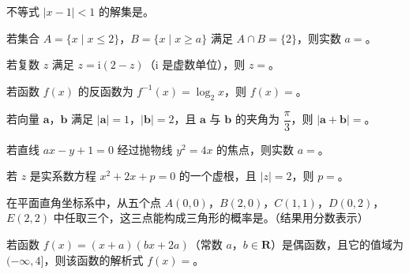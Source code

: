 


\begin{question}
不等式 $|x-1|<1$ 的解集是\gkblank{}。

\end{question}
\begin{question}
若集合 $A=\{x\mid x\leqslant2\}$，$B=\{x\mid x\geqslant a\}$ 满足 $A\cap B=\{2\}$，则实数 $a=$\gkblank{}。

\end{question}
\begin{question}
若复数 $z$ 满足 $z=\mathrm i(2-z)$（$\mathrm i$ 是虚数单位），则 $z=$\gkblank{}。

\end{question}
\begin{question}
若函数 $f(x)$ 的反函数为 $f^{-1}(x)=\log_2x$，则 $f(x)=$\gkblank{}。

\end{question}
\begin{question}
若向量 $\boldsymbol a$，$\boldsymbol b$ 满足 $|\boldsymbol a|=1$，$|\boldsymbol b|=2$，且 $\boldsymbol a$ 与 $\boldsymbol b$ 的夹角为 $\dfrac{\pi}3$，则 $|\boldsymbol a+\boldsymbol b|=$\gkblank{}。

\end{question}
\begin{question}
若直线 $ax-y+1=0$ 经过抛物线 $y^2=4x$ 的焦点，则实数 $a=$\gkblank{}。

\end{question}
\begin{question}
若 $z$ 是实系数方程 $x^2+2x+p=0$ 的一个虚根，且 $|z|=2$，则 $p=$\gkblank{}。

\end{question}
\begin{question}
在平面直角坐标系中，从五个点 $A(0,0)$，$B(2,0)$，$C(1,1)$，$D(0,2)$，$E(2,2)$ 中任取三个，这三点能构成三角形的概率是\gkblank{}。（结果用分数表示）

\end{question}
\begin{question}
若函数 $f(x)=(x+a)(bx+2a)$（常数 $a$，$b\in\mathbf R$）是偶函数，且它的值域为 $(-\infty,4]$，则该函数的解析式 $f(x)=$\gkblank{}。

\end{question}
